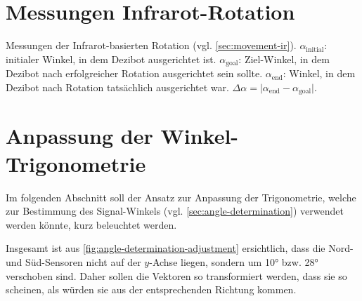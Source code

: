 \section{Messungen Infrarot-Rotation}
\label{sec:measurements-ir-rotation}

\begin{table}[h!]
    \centering
    
    \caption{Messungen der Infrarot-basierten Rotation (vgl. \autoref{sec:movement-ir}). $\alpha_{\text{initial}}$: initialer Winkel, in dem Dezibot ausgerichtet ist. $\alpha_{\text{goal}}$: Ziel-Winkel, in dem Dezibot nach erfolgreicher Rotation ausgerichtet sein sollte. $\alpha_{\text{end}}$: Winkel, in dem Dezibot nach Rotation tatsächlich ausgerichtet war. $\Delta\alpha = \vert\alpha_{\text{end}}-\alpha_{\text{goal}}\vert$.}
    \label{tab:measurements-ir-rotation}
\end{table}


\section{Anpassung der Winkel-Trigonometrie}
\label{sec:angle-determination-adjustment}

Im folgenden Abschnitt soll der Ansatz zur Anpassung der Trigonometrie, welche zur Bestimmung des Signal\hyphen Winkels (vgl. \autoref{sec:angle-determination}) verwendet werden könnte, kurz beleuchtet werden.

Insgesamt ist aus \autoref{fig:angle-determination-adjustment} ersichtlich, dass die Nord- und Süd\hyphen Sensoren nicht auf der $y$-Achse liegen, sondern um 10° bzw. 28° verschoben sind. Daher sollen die Vektoren so transformiert werden, dass sie so scheinen, als würden sie aus der entsprechenden Richtung kommen.

